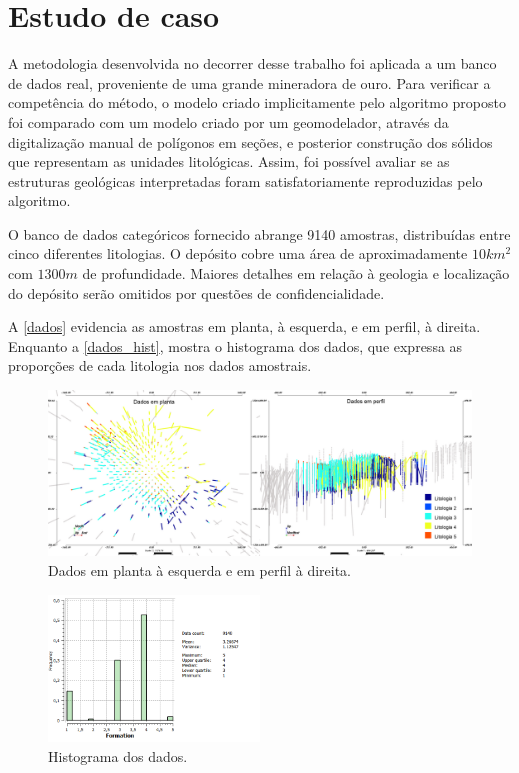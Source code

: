 \chapter{Estudo de caso}\label{estudo_de_caso}

A metodologia desenvolvida no decorrer desse trabalho foi aplicada a um banco de dados real, proveniente de uma grande mineradora de ouro. Para verificar a competência do método, o modelo criado implicitamente pelo algoritmo proposto foi comparado com um modelo criado por um geomodelador, através da digitalização manual de polígonos em seções, e posterior construção dos sólidos que representam as unidades litológicas. Assim, foi possível avaliar se as estruturas geológicas interpretadas foram satisfatoriamente reproduzidas pelo algoritmo.

O banco de dados categóricos fornecido abrange 9140 amostras, distribuídas entre cinco diferentes litologias. O depósito cobre uma área de aproximadamente $10km^2$ com $1300m$ de profundidade. Maiores detalhes em relação à geologia e localização do depósito serão omitidos por questões de confidencialidade.

A \autoref{dados} evidencia as amostras em planta, à esquerda, e em perfil, à direita. Enquanto a \autoref{dados_hist}, mostra o histograma dos dados, que expressa as proporções de cada litologia nos dados amostrais.

\begin{figure}[H]
	\caption{\label{dados}Dados em planta à esquerda e em perfil à direita.}
	\begin{center}
		\includegraphics[width=\textwidth]{estudo_de_caso/dados}
	\end{center}
\end{figure}

\begin{figure}[!htb]
	\caption{\label{dados_hist}Histograma dos dados.}
	\begin{center}
		\includegraphics[width=0.5\textwidth]{estudo_de_caso/histograma_dados}
	\end{center}
\end{figure}

